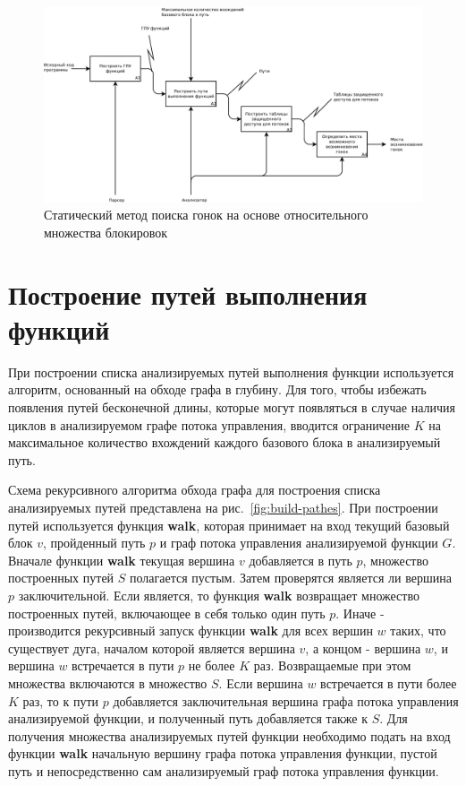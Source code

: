 \begin{figure}
  \centering
  \includegraphics[width=\textwidth]{inc/dia/idef0}
  \caption{Статический метод поиска гонок на основе относительного множества блокировок}
  \label{fig:idef0}
\end{figure}

 
\section{Построение путей выполнения функций}

При построении списка анализируемых путей выполнения функции используется алгоритм, основанный на обходе графа в глубину. Для того, чтобы избежать появления путей бесконечной длины, которые могут появляться в случае наличия циклов в анализируемом графе потока управления, вводится ограничение $K$ на максимальное количество вхождений каждого базового блока в анализируемый путь.

Схема рекурсивного алгоритма обхода графа для построения списка анализируемых путей представлена на рис.~\ref{fig:build-pathes}. При построении путей используется функция \textbf{walk}, которая принимает на вход текущий базовый блок $v$, пройденный путь $p$ и граф потока управления анализируемой функции $G$. Вначале функции \textbf{walk} текущая вершина $v$ добавляется в путь $p$, множество построенных путей $S$ полагается пустым. Затем проверятся является ли вершина $p$ заключительной. Если является, то функция \textbf{walk} возвращает множество построенных путей, включающее в себя только один путь $p$. Иначе - производится рекурсивный запуск функции \textbf{walk} для всех вершин $w$ таких, что существует дуга, началом которой является вершина $v$, а концом - вершина $w$, и вершина $w$ встречается в пути $p$ не более $K$ раз. Возвращаемые при этом  множества включаются в множество $S$. Если вершина $w$ встречается в пути более $K$ раз, то к пути $p$ добавляется заключительная вершина графа потока управления анализируемой функции, и полученный путь добавляется также к $S$. Для получения множества анализируемых путей функции необходимо подать на вход функции \textbf{walk} начальную вершину графа потока управления функции, пустой путь и непосредственно сам анализируемый граф потока управления функции.

